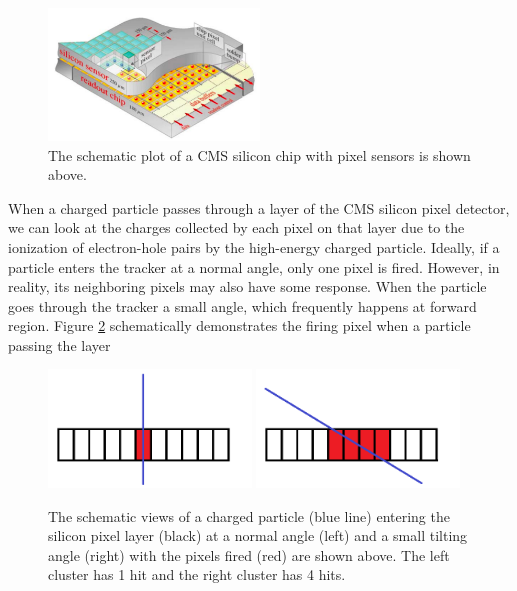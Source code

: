\begin{figure}[hbtp]
\begin{center}
\includegraphics[width=0.50\textwidth]{Figures/Chapter4/CMSPixChip.png}
\caption{The schematic plot of a CMS silicon chip with pixel sensors is shown above.}
\label{CMSPixChip}
\end{center}
\end{figure} 

When a charged particle passes through a layer of the CMS silicon pixel detector, we can look at the charges collected by each pixel on that layer due to the ionization of electron-hole pairs by the high-energy charged particle. Ideally, if a particle enters the tracker at a normal angle, only one pixel is fired. However, in reality, its neighboring pixels may also have some response. When the particle goes through the tracker a small angle, which frequently happens at forward region. Figure \ref{HitDemo} schematically demonstrates the firing pixel when a particle passing the layer

\begin{figure}[hbtp]
\begin{center}
\includegraphics[width=0.48\textwidth]{Figures/Chapter4/Hit1.png}
\includegraphics[width=0.48\textwidth]{Figures/Chapter4/Hit2.png}
\caption{The schematic views of a charged particle (blue line) entering the silicon pixel layer (black) at a normal angle (left) and a small tilting angle (right) with the pixels fired (red) are shown above. The left cluster has 1 hit and the right cluster has 4 hits.}
\label{HitDemo}
\end{center}
\end{figure} 

